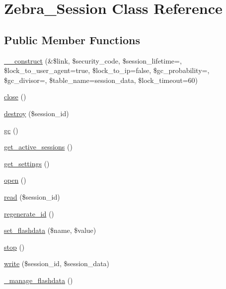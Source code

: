 \hypertarget{class_zebra___session}{}\section{Zebra\+\_\+\+Session Class Reference}
\label{class_zebra___session}
\subsection*{Public Member Functions}
\begin{DoxyCompactItemize}
\item 
\mbox{\hyperlink{class_zebra___session_ad455e02743bbe3986d80650f417bd206}{\+\_\+\+\_\+construct}} (\&\$link, \$security\+\_\+code, \$session\+\_\+lifetime=\textquotesingle{}\textquotesingle{}, \$lock\+\_\+to\+\_\+user\+\_\+agent=true, \$lock\+\_\+to\+\_\+ip=false, \$gc\+\_\+probability=\textquotesingle{}\textquotesingle{}, \$gc\+\_\+divisor=\textquotesingle{}\textquotesingle{}, \$table\+\_\+name=\textquotesingle{}session\+\_\+data\textquotesingle{}, \$lock\+\_\+timeout=60)
\item 
\mbox{\hyperlink{class_zebra___session_aa69c8bf1f1dcf4e72552efff1fe3e87e}{close}} ()
\item 
\mbox{\hyperlink{class_zebra___session_aaec5812f6b4eb6835f88d3baa06a002a}{destroy}} (\$session\+\_\+id)
\item 
\mbox{\hyperlink{class_zebra___session_a14ff7ef4b198ff14884dd8c564264ca3}{gc}} ()
\item 
\mbox{\hyperlink{class_zebra___session_a7d6d31df5f4285519ff1efbc783c36a7}{get\+\_\+active\+\_\+sessions}} ()
\item 
\mbox{\hyperlink{class_zebra___session_abcfd9631c087a2aa25d472ad9b450c4f}{get\+\_\+settings}} ()
\item 
\mbox{\hyperlink{class_zebra___session_a44a2ac59a3b91f8c18905dce700934d6}{open}} ()
\item 
\mbox{\hyperlink{class_zebra___session_a5bbf84ebf657be4eaccc0582377c76bf}{read}} (\$session\+\_\+id)
\item 
\mbox{\hyperlink{class_zebra___session_a55c3728e57cce5405330bd67c44906fb}{regenerate\+\_\+id}} ()
\item 
\mbox{\hyperlink{class_zebra___session_acc03870f281b5f4c00dc940849b2c83e}{set\+\_\+flashdata}} (\$name, \$value)
\item 
\mbox{\hyperlink{class_zebra___session_a8b6fc76a620d7557d06e9a11a9ffb509}{stop}} ()
\item 
\mbox{\hyperlink{class_zebra___session_ad9d124885be93668f1dbf6aace5964f5}{write}} (\$session\+\_\+id, \$session\+\_\+data)
\item 
\mbox{\hyperlink{class_zebra___session_af8de5d6fbd0151839a15e38fffaf9897}{\+\_\+manage\+\_\+flashdata}} ()
\end{DoxyCompactItemize}


